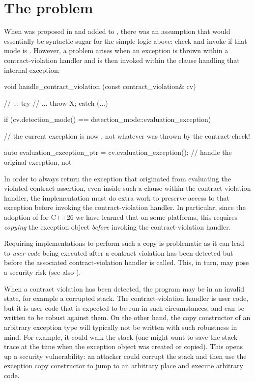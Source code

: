 \section{The problem}

When  was proposed in \cite{P3227R1} and added to \cite{P2900R14}, there was an assumption that would  essentially be syntactic sugar for the simple logic above: check \mbox{} and invoke \mbox{} if that mode is \mbox{}. However, a problem arises when an exception is thrown within a contract-violation handler and  is then invoked within the  clause handling that internal exception:

\begin{codeblock}
void handle_contract_violation (const contract_violation& cv) {
  // ...
  try {
    // ...
    throw X;
  } catch (...) {
      if (cv.detection_mode() == detection_mode::evaluation_exception) {
        // the current exception is now , not whatever was thrown by the contract check!
        
        auto evaluation_exception_ptr = cv.evaluation_exception();
        // handle the original exception, not 
      }
  }
}
\end{codeblock}

In order to always return the exception that originated from evaluating the violated contract assertion, even inside such a  clause within the contract-violation handler, the implementation must do extra work to preserve access to that exception before invoking the contract-violation handler. In particular, since the adoption of \cite{P2900R14} for C++26 we have learned that on some platforms, this requires \emph{copying} the exception object \emph{before} invoking the contract-violation handler. 

Requiring implementations to perform such a copy is problematic as it can lead to \emph{user code} being executed after a contract violation has been detected but before the associated contract-violation handler is called. This, in turn, may pose a security risk (see also \cite{P3417R1}).

When a contract violation has been detected, the program may be in an invalid state, for example a corrupted stack. The contract-violation handler is user code, but it is user code that is expected to be run in such circumstances, and can be written to be robust against them. On the other hand, the copy constructor of an arbitrary exception type will typically not be written with such robustness in mind. For example, it could walk the stack (one might want to save the stack trace at the time when the exception object was created or copied). This opens up a security vulnerability: an attacker could corrupt the stack and then use the exception copy constructor to jump to an arbitrary place and execute arbitrary code.

